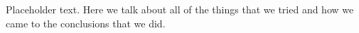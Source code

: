 Placeholder text. Here we talk about all of the things that we tried and how we came to the conclusions that we did. 
